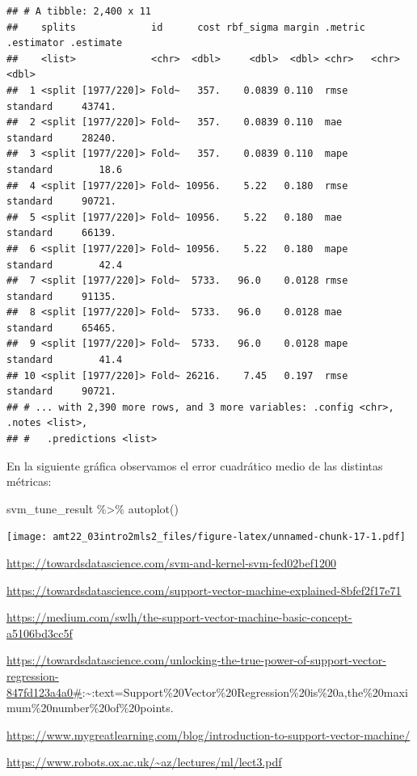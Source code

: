 \documentclass[
]{book}
\newenvironment{Shaded}{\begin{snugshade}}{\end{snugshade}}
\newcommand{\FunctionTok}[1]{\textcolor[rgb]{0.00,0.00,0.00}{#1}}
\newcommand{\NormalTok}[1]{#1}
\newcommand{\SpecialCharTok}[1]{\textcolor[rgb]{0.00,0.00,0.00}{#1}}
\begin{document}
\begin{verbatim}
## # A tibble: 2,400 x 11
##    splits             id      cost rbf_sigma margin .metric .estimator .estimate
##    <list>             <chr>  <dbl>     <dbl>  <dbl> <chr>   <chr>          <dbl>
##  1 <split [1977/220]> Fold~   357.    0.0839 0.110  rmse    standard     43741. 
##  2 <split [1977/220]> Fold~   357.    0.0839 0.110  mae     standard     28240. 
##  3 <split [1977/220]> Fold~   357.    0.0839 0.110  mape    standard        18.6
##  4 <split [1977/220]> Fold~ 10956.    5.22   0.180  rmse    standard     90721. 
##  5 <split [1977/220]> Fold~ 10956.    5.22   0.180  mae     standard     66139. 
##  6 <split [1977/220]> Fold~ 10956.    5.22   0.180  mape    standard        42.4
##  7 <split [1977/220]> Fold~  5733.   96.0    0.0128 rmse    standard     91135. 
##  8 <split [1977/220]> Fold~  5733.   96.0    0.0128 mae     standard     65465. 
##  9 <split [1977/220]> Fold~  5733.   96.0    0.0128 mape    standard        41.4
## 10 <split [1977/220]> Fold~ 26216.    7.45   0.197  rmse    standard     90721. 
## # ... with 2,390 more rows, and 3 more variables: .config <chr>, .notes <list>,
## #   .predictions <list>
\end{verbatim}

En la siguiente gráfica observamos el error cuadrático medio de las distintas métricas:

\begin{Shaded}
\begin{Highlighting}[]
\NormalTok{svm\_tune\_result }\SpecialCharTok{\%\textgreater{}\%} \FunctionTok{autoplot}\NormalTok{()}
\end{Highlighting}
\end{Shaded}

\texttt{[image: amt22\_03intro2mls2\_files/figure-latex/unnamed-chunk-17-1.pdf]}

\url{https://towardsdatascience.com/svm-and-kernel-svm-fed02bef1200}

\url{https://towardsdatascience.com/support-vector-machine-explained-8bfef2f17e71}

\url{https://medium.com/swlh/the-support-vector-machine-basic-concept-a5106bd3cc5f}

\url{https://towardsdatascience.com/unlocking-the-true-power-of-support-vector-regression-847fd123a4a0\#}:\textasciitilde:text=Support\%20Vector\%20Regression\%20is\%20a,the\%20maximum\%20number\%20of\%20points.

\url{https://www.mygreatlearning.com/blog/introduction-to-support-vector-machine/}

\url{https://www.robots.ox.ac.uk/~az/lectures/ml/lect3.pdf}

  
\end{document}
